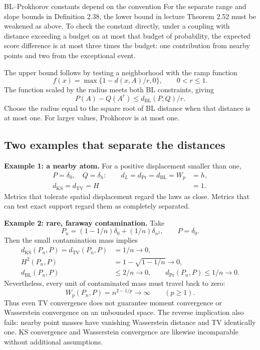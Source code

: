 \documentclass[12pt]{article}
\begin{document}
\begin{correctionbox}{BL--Prokhorov constants depend on the convention}
For the separate range and slope bounds in Definition 2.38, the lower
bound in lecture Theorem 2.52 must be weakened as above. To check the
constant directly, under a coupling with distance exceeding a budget on
at most that budget of probability, the expected score difference is at
most three times the budget: one contribution from nearby points and two
from the exceptional event.

The upper bound follows by testing a neighborhood with the ramp function
\begin{equation}
 f(x)=\max\{1-d(x,A)/r,0\},\qquad 0<r\le1.
\end{equation}
The function scaled by the radius meets both BL constraints, giving
\begin{equation}
 P(A)-Q(A^r)\le d_{\mathrm{BL}}(P,Q)/r.
\end{equation}
Choose the radius equal to the square root of BL distance when that
distance is at most one. For larger values, Prokhorov is at most one.
\end{correctionbox}
\par\endgroup

\clearpage
\begingroup\small
\subsection{Two examples that separate the distances}
\textbf{Example 1: a nearby atom.} For a positive displacement smaller than one,
\begin{align}
 P=\delta_0,\quad Q=\delta_h:\qquad
 d_L=d_{\mathrm{Pr}}=d_{\mathrm{BL}}=W_p&=h,\\
 d_{\mathrm{KS}}=d_{\mathrm{TV}}=H&=1.
\end{align}
Metrics that tolerate spatial displacement regard the laws as close.
Metrics that can test exact support regard them as completely separated.

\textbf{Example 2: rare, faraway contamination.} Take
\begin{equation}
 P_n=(1-1/n)\delta_0+(1/n)\delta_{n^2},\qquad P=\delta_0.
\end{equation}
Then the small contamination mass implies
\begin{align}
 d_{\mathrm{KS}}(P_n,P)=d_{\mathrm{TV}}(P_n,P)&=1/n\to0,\\
 H^2(P_n,P)&=1-\sqrt{1-1/n}\to0,\\
 d_{\mathrm{BL}}(P_n,P)&\le2/n\to0,
 \qquad d_{\mathrm{Pr}}(P_n,P)\le1/n\to0.
\end{align}
Nevertheless, every unit of contaminated mass must travel back to zero:
\begin{equation}
 W_p(P_n,P)=n^{2-1/p}\longrightarrow\infty\qquad(p\ge1).
\end{equation}
Thus even TV convergence does not guarantee moment convergence or
Wasserstein convergence on an unbounded space. The reverse implication
also fails: nearby point masses have vanishing Wasserstein distance and
TV identically one. KS convergence and Wasserstein convergence are likewise
incomparable without additional assumptions.
\end{document}
